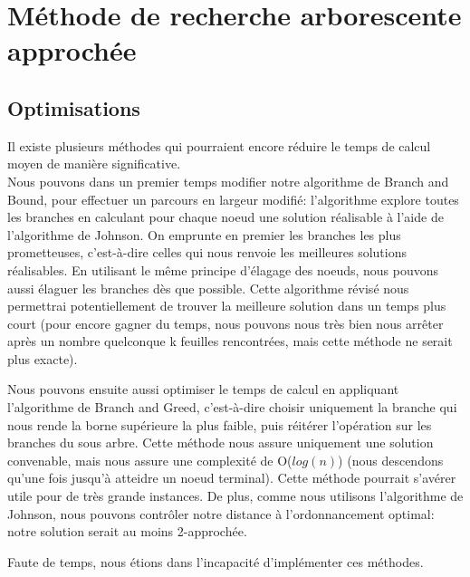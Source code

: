\documentclass[12pt]{article}
\begin{document}

\clearpage
\newpage
\section{Méthode de recherche arborescente approchée}

\subsection{Optimisations}

Il existe plusieurs méthodes qui pourraient encore réduire le temps de calcul moyen de manière significative.\\

Nous pouvons dans un premier temps modifier notre algorithme de Branch and Bound, pour effectuer un parcours en largeur modifié: l'algorithme explore toutes les branches en calculant pour chaque noeud une solution réalisable à l'aide de l'algorithme de Johnson. On emprunte en premier les branches les plus prometteuses, c'est-à-dire celles qui nous renvoie les meilleures solutions réalisables. En utilisant le même principe d'élagage des noeuds, nous pouvons aussi élaguer les branches dès que possible. Cette algorithme révisé nous permettrai potentiellement de trouver la meilleure solution dans un temps plus court (pour encore gagner du temps, nous pouvons nous très bien nous arrêter après un nombre quelconque k feuilles rencontrées, mais cette méthode ne serait plus exacte).

Nous pouvons ensuite aussi optimiser le temps de calcul en appliquant l'algorithme de Branch and Greed, c'est-à-dire choisir uniquement la branche qui nous rende la borne supérieure la plus faible, puis réitérer l'opération sur les branches du sous arbre. Cette méthode nous assure uniquement une solution convenable, mais nous assure une complexité de O($log(n)$) (nous descendons qu'une fois jusqu'à atteidre un noeud terminal). Cette méthode pourrait s'avérer utile pour de très grande instances. De plus, comme nous utilisons l'algorithme de Johnson, nous pouvons contrôler notre distance à l'ordonnancement optimal: notre solution serait au moins 2-approchée.

Faute de temps, nous étions dans l'incapacité d'implémenter ces méthodes.
\clearpage
\newpage
\end{document}
